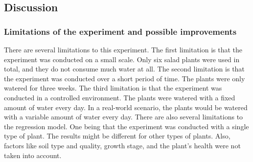 \documentclass[11pt]{scrartcl} %
\begin{document}
\subsection{Discussion}
\subsubsection{Limitations of the experiment and possible improvements}
\label{sec:limitations}
There are several limitations to this experiment. The first limitation is that the experiment was conducted on a small scale. Only six salad plants were used in total, and they do not consume much water at all. The second limitation is that the experiment was conducted over a short period of time. The plants were only watered for three weeks. The third limitation is that the experiment was conducted in a controlled environment. The plants were watered with a fixed amount of water every day. In a real-world scenario, the plants would be watered with a variable amount of water every day.
\newline There are also several limitations to the regression model. One being that the experiment was conducted with a single type of plant. The results might be different for other types of plants. Also, factors like soil type and quality, growth stage, and the plant's health were not taken into account.
\end{document}
